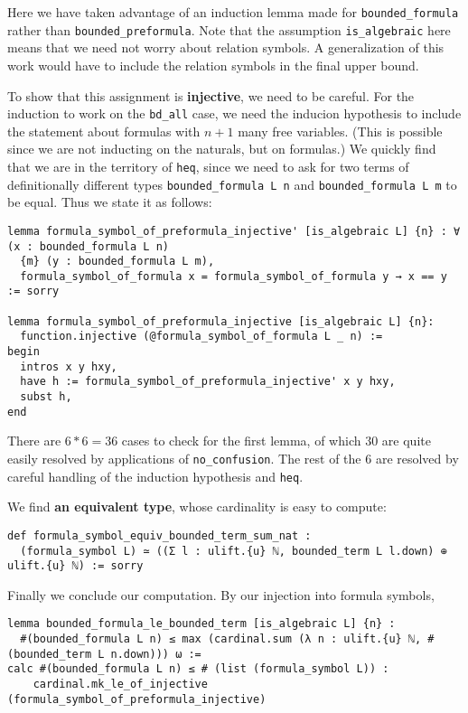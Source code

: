 \documentclass{article}
\newcommand{\<}{\langle}
\renewcommand{\>}{\rangle}
\theoremstyle{definitionstyle}
\theoremstyle{exercisestyle}
\theoremstyle{remarkstyle}
\begin{document}
Here we have taken advantage of an induction lemma made for \texttt{bounded\_{formula}}
rather than \texttt{bounded\_{preformula}}.
Note that the assumption \texttt{is\_{algebraic}} here means that we need not
worry about relation symbols.
A generalization of this work would have to include the relation symbols
in the final upper bound.

To show that this assignment is \textbf{injective},
we need to be careful.
For the induction to work on the \texttt{bd\_all} case,
we need the inducion hypothesis to include the statement about formulas
with $n+1$ many free variables.
(This is possible since we are not inducting on the naturals, but on formulas.)
We quickly find that we are in the territory of \texttt{heq},
since we need to ask for two terms of definitionally different types
\texttt{bounded\_formula L n} and \texttt{bounded\_formula L m} to be equal.
Thus we state it as follows:

\begin{lstlisting}
lemma formula_symbol_of_preformula_injective' [is_algebraic L] {n} : ∀ (x : bounded_formula L n)
  {m} (y : bounded_formula L m),
  formula_symbol_of_formula x = formula_symbol_of_formula y → x == y := sorry

lemma formula_symbol_of_preformula_injective [is_algebraic L] {n}:
  function.injective (@formula_symbol_of_formula L _ n) :=
begin
  intros x y hxy,
  have h := formula_symbol_of_preformula_injective' x y hxy,
  subst h,
end \end{lstlisting}

There are $6 * 6 = 36$ cases to check for the first lemma,
of which $30$ are quite easily resolved by applications of
\texttt{no\_confusion}.
The rest of the $6$ are resolved by careful handling of the induction
hypothesis and \texttt{heq}.

We find \textbf{an equivalent type}, whose cardinality is easy to compute:

\begin{lstlisting}
def formula_symbol_equiv_bounded_term_sum_nat :
  (formula_symbol L) ≃ ((Σ l : ulift.{u} ℕ, bounded_term L l.down) ⊕ ulift.{u} ℕ) := sorry \end{lstlisting}

Finally we conclude our computation.
By our injection into formula symbols,

\begin{lstlisting}
lemma bounded_formula_le_bounded_term [is_algebraic L] {n} :
  #(bounded_formula L n) ≤ max (cardinal.sum (λ n : ulift.{u} ℕ, #(bounded_term L n.down))) ω :=
calc #(bounded_formula L n) ≤ # (list (formula_symbol L)) :
    cardinal.mk_le_of_injective (formula_symbol_of_preformula_injective) \end{lstlisting}
\end{document}
